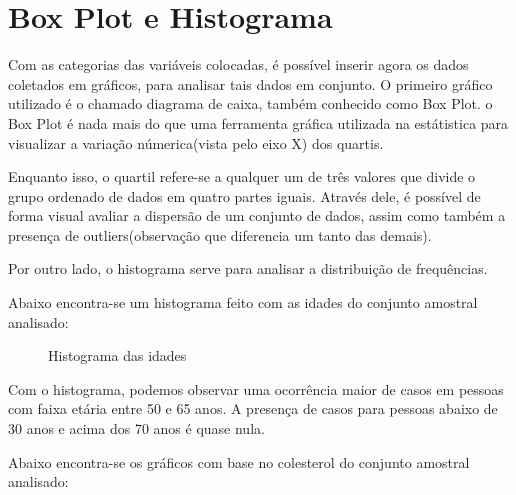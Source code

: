 \chapter{Box Plot e Histograma}

    \setcounter{section}{0}

    Com as categorias das variáveis colocadas, é possível inserir agora os dados coletados em gráficos, para 
    analisar tais dados em conjunto. O primeiro gráfico utilizado é o chamado diagrama de caixa, também conhecido
    como Box Plot. o Box Plot é nada mais do que uma ferramenta gráfica utilizada na estátistica para visualizar 
    a variação númerica(vista pelo eixo X) dos quartis.

    Enquanto isso, o quartil refere-se a qualquer um de três valores que divide o grupo ordenado de dados em quatro partes 
    iguais. Através dele, é possível de forma visual avaliar a dispersão de um conjunto de dados, assim como também a presença 
    de outliers(observação que diferencia um tanto das demais).
    
    Por outro lado, o histograma serve para analisar a distribuição de frequências.

    Abaixo encontra-se um histograma feito com as idades do conjunto amostral analisado:

    \begin{figure}[H]
        \centering
        \caption{Histograma das idades}  
    \end{figure}

    Com o histograma, podemos observar uma ocorrência maior de casos em pessoas com 
    faixa etária entre 50 e 65 anos. A presença de casos para pessoas abaixo de 30 
    anos e acima dos 70 anos é quase nula.

    Abaixo encontra-se os gráficos com base no colesterol do conjunto amostral analisado:

